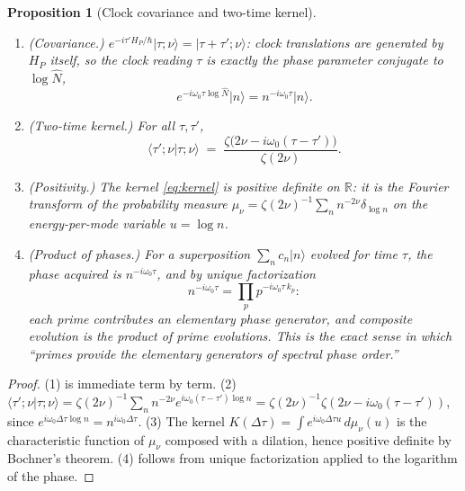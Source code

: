 \documentclass[11pt,a4paper]{article}
\theoremstyle{plain}
\newtheorem{proposition}[theorem]{Proposition}
\theoremstyle{definition}
\theoremstyle{remark}
\newcommand{\ket}[1]{\lvert #1\rangle}
\newcommand{\braket}[2]{\langle #1\rvert #2\rangle}
\newcommand{\Rr}{\mathbb{R}}
\newcommand{\Nhat}{\widehat{N}}
\begin{document}
\begin{proposition}[Clock covariance and two-time kernel]\label{prop:kernel}
\begin{enumerate}[leftmargin=1.6em]
\item (Covariance.) $e^{-i\tau' H_{P}/\hbar}\ket{\tau;\nu}=\ket{\tau+\tau';\nu}$: clock
translations are generated by $H_{P}$ itself, so the clock reading $\tau$ is exactly the
phase parameter conjugate to $\log\Nhat$,
\begin{equation}
e^{-i\omega_{0}\tau\log\Nhat}\ket{n}=n^{-i\omega_{0}\tau}\ket{n}.
\end{equation}
\item (Two-time kernel.) For all $\tau,\tau'$,
\begin{equation}\label{eq:kernel}
\braket{\tau';\nu}{\tau;\nu}
\;=\;\frac{\zeta\bigl(2\nu-i\omega_{0}(\tau-\tau')\bigr)}{\zeta(2\nu)}.
\end{equation}
\item (Positivity.) The kernel \eqref{eq:kernel} is positive definite on $\Rr$: it is the
Fourier transform of the probability measure
$\mu_{\nu}=\zeta(2\nu)^{-1}\sum_{n}n^{-2\nu}\delta_{\log n}$ on the energy-per-mode
variable $u=\log n$.
\item (Product of phases.) For a superposition $\sum_{n}c_{n}\ket{n}$ evolved for time
$\tau$, the phase acquired is $n^{-i\omega_{0}\tau}$, and by unique factorization
\begin{equation}
n^{-i\omega_{0}\tau}=\prod_{p}p^{-i\omega_{0}\tau\,k_{p}}:
\end{equation}
each prime contributes an elementary phase generator, and composite evolution is the product
of prime evolutions. This is the exact sense in which ``primes provide the elementary
generators of spectral phase order.''
\end{enumerate}
\end{proposition}

\begin{proof}
(1) is immediate term by term. (2) $\braket{\tau';\nu}{\tau;\nu}
=\zeta(2\nu)^{-1}\sum_{n}n^{-2\nu}e^{i\omega_{0}(\tau-\tau')\log n}
=\zeta(2\nu)^{-1}\zeta(2\nu-i\omega_{0}(\tau-\tau'))$, since
$e^{i\omega_{0}\Delta\tau\log n}=n^{i\omega_{0}\Delta\tau}$. (3) The kernel
$K(\Delta\tau)=\int e^{i\omega_{0}\Delta\tau u}\,d\mu_{\nu}(u)$ is the characteristic
function of $\mu_{\nu}$ composed with a dilation, hence positive definite by Bochner's
theorem. (4) follows from unique factorization applied to the logarithm of the phase.
\end{proof}
\end{document}
